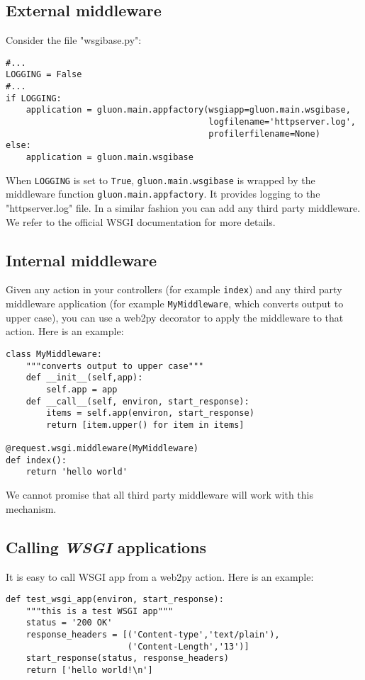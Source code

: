 \documentclass[justified,sixbynine,notoc]{tufte-book}
\def\ft{\small\tt}
\begin{document}
\begin{fullwidth}
\goodbreak\subsection{External middleware}

Consider the file "wsgibase.py":
\begin{lstlisting}
#...
LOGGING = False
#...
if LOGGING:
    application = gluon.main.appfactory(wsgiapp=gluon.main.wsgibase,
                                        logfilename='httpserver.log',
                                        profilerfilename=None)
else:
    application = gluon.main.wsgibase
\end{lstlisting}

When {\ft LOGGING} is set to {\ft True}, {\ft gluon.main.wsgibase} is wrapped by the middleware function {\ft gluon.main.appfactory}. It provides logging to the "httpserver.log" file. In a similar fashion you can add any third party middleware. We refer to the official WSGI documentation for more details.

\goodbreak\subsection{Internal middleware}

Given any action in your controllers (for example {\ft index}) and any third party middleware application (for example {\ft MyMiddleware}, which converts output to upper case), you can use a web2py decorator to apply the middleware to that action. Here is an example:
\begin{lstlisting}
class MyMiddleware:
    """converts output to upper case"""
    def __init__(self,app):
        self.app = app
    def __call__(self, environ, start_response):
        items = self.app(environ, start_response)
        return [item.upper() for item in items]

@request.wsgi.middleware(MyMiddleware)
def index():
    return 'hello world'
\end{lstlisting}

We cannot promise that all third party middleware will work with this mechanism.

\goodbreak\subsection{Calling {\it WSGI} applications}

It is easy to call WSGI app from a web2py action. Here is an example:
\begin{lstlisting}
def test_wsgi_app(environ, start_response):
    """this is a test WSGI app"""
    status = '200 OK'
    response_headers = [('Content-type','text/plain'),
                        ('Content-Length','13')]
    start_response(status, response_headers)
    return ['hello world!\n']


\end{lstlisting}
\end{fullwidth}
\end{document}
